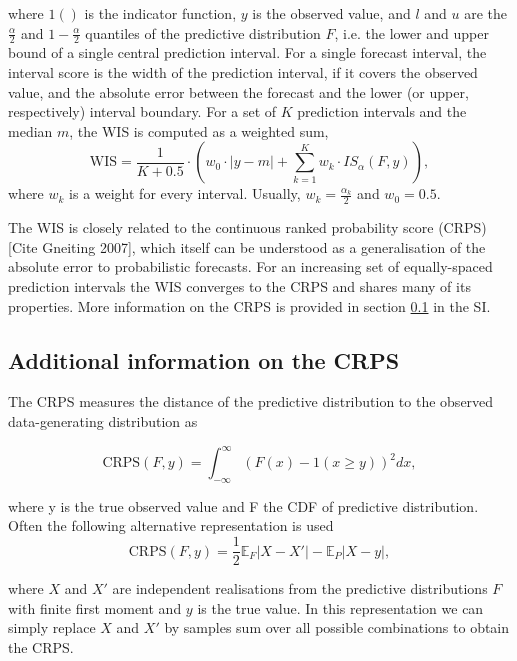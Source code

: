 \documentclass{article}
\begin{document}
where $1()$ is the indicator function, $y$ is the observed value, and $l$ and $u$ are the $\frac{\alpha}{2}$ and $1 - \frac{\alpha}{2}$ quantiles of the predictive distribution $F$, i.e. the lower and upper bound of a single central prediction interval. For a single forecast interval, the interval score is the width of the prediction interval, if it covers the observed value, and the absolute error between the forecast and the lower (or upper, respectively) interval boundary. For a set of $K$ prediction intervals and the median $m$, the WIS is computed as a weighted sum, 
\begin{equation}
\text{WIS} = \frac{1}{K + 0.5} \cdot \left(w_0 \cdot |y - m| + \sum_{k = 1}^{K} w_k \cdot IS_{\alpha}(F, y)\right),    
\end{equation} 
where $w_k$ is a weight for every interval. Usually, $w_k = \frac{\alpha_k}{2}$ and $w_0 = 0.5$. 


The WIS is closely related to the continuous ranked probability score (CRPS) [Cite Gneiting 2007], which itself can be understood as a generalisation of the absolute error to probabilistic forecasts. For an increasing set of equally-spaced prediction intervals the WIS converges to the CRPS and shares many of its properties. More information on the CRPS is provided in section \ref{crps} in the SI. 

\subsection{Additional information on the CRPS} \label{crps}

The CRPS measures the distance of the predictive distribution to the observed data-generating distribution as 

\begin{equation}
    \text{CRPS}(F, y) = \int_{-\infty}^\infty \left( F(x) - 1(x \geq y) \right)^2 dx,
\end{equation}

where y is the true observed value and F the CDF of predictive distribution. Often the following alternative representation is used
\begin{equation}
    \text{CRPS}(F, y) = \frac{1}{2} \mathbb{E}_{F} |X - X'| - \mathbb{E}_P |X - y|,
\end{equation}
  
where $X$ and $X'$ are independent realisations from the predictive distributions $F$ with finite first moment and $y$ is the true value. In this representation we can simply replace $X$ and $X'$ by samples sum over all possible combinations to obtain the CRPS.  
\end{document}
